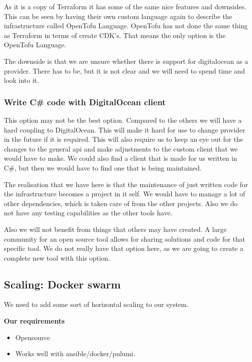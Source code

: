 As it is a copy of Terraform it has some of the same nice features and downsides. This can be seen by having their own custom language again to describe the infrastructure called OpenTofu Language. OpenTofu has not done the same thing as Terraform in terms of create CDK's. That means the only option is the OpenTofu Language.

The downside is that we are unsure whether there is support for digitalocean as a provider. There has to be, but it is not clear and we will need to spend time and look into it.

\subsubsection{Write C\# code with DigitalOcean client}

This option may not be the best option. Compared to the others we will have a hard coupling to DigitalOcean. This will make it hard for use to change provider in the future if it is required. This will also require us to keep an eye out for the changes to the general api and make adjustments to the custom client that we would have to make. We could also find a client that is made for us written in C\#, but then we would have to find one that is being maintained.

The realisation that we have here is that the maintenance of just written code for the infrastructure becomes a project in it self. We would have to manage a lot of other dependencies, which is taken care of from the other projects. Also we do not have any testing capabilities as the other tools have.

Also we will not benefit from things that others may have created. A large community for an open source tool allows for sharing solutions and code for that specific tool. We do not really have that option here, as we are going to create a complete new tool with this option.

\subsection{Scaling: Docker swarm}

We need to add some sort of horizontal scaling to our system.

\textbf{Our requirements}

\begin{itemize}
    \item Opensource
    \item Works well with ansible/docker/pulumi.
\end{itemize}

